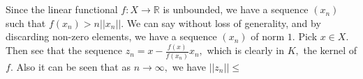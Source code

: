 \documentclass{article}
\begin{document}
\section{} %
Since the linear functional $f:X \rightarrow \mathbb{R}$ is unbounded, we have a sequence $(x_n)$ such that $f(x_n) > n ||x_n||.$ We can say without loss of 
generality, and by discarding non-zero elements, we have a sequence $(x_n)$ of norm $1.$ Pick $x \in X.$ Then see that the sequence 
$z_n=x-\frac{f(x)}{f(x_n)}x_n,$ which is clearly in $K,$ the kernel of $f.$ Also it can be seen that as $n \to \infty,$ we have $||z_n|| \leq$
\section{} %
\end{document}
